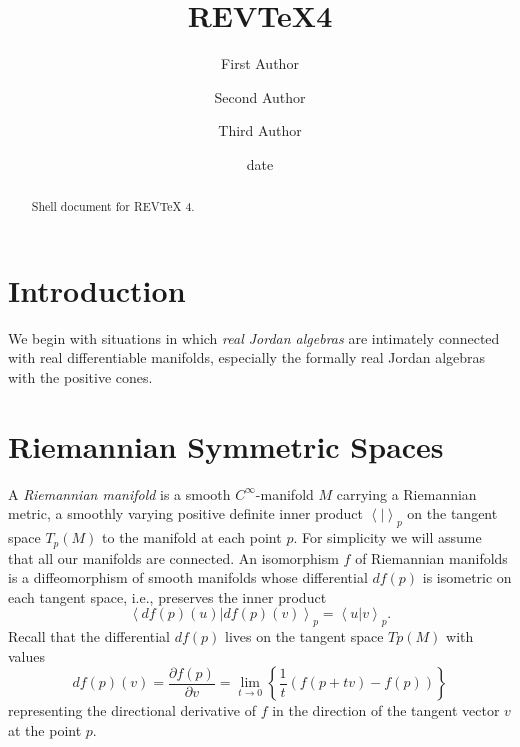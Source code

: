 \documentclass[aps,preprint]{revtex4}%
\begin{document}
\title[Short title for running header]{REV\TeX4}
\author{First Author}
\author{Second Author}
\author{Third Author}

\begin{abstract}
Shell document for REV\TeX{} 4.

\end{abstract}
\date[Date text]{date}




\maketitle
\tableofcontents


\section{Introduction}

We begin with situations in which \emph{real Jordan algebras} are intimately
connected with real differentiable manifolds, especially the formally real
Jordan algebras with the positive cones.

\section{Riemannian Symmetric Spaces}

A \emph{Riemannian manifold} is a smooth $C^{\infty}$-manifold $M$ carrying a
Riemannian metric, a smoothly varying positive definite inner product
$\left\langle \left.  {}\right\vert \right\rangle _{p}$ on the tangent space
$T_{p}(M)$ to the manifold at each point $p$. For simplicity we will assume
that all our manifolds are connected. An isomorphism $f$ of Riemannian
manifolds is a diffeomorphism of smooth manifolds whose differential
$df\left(  p\right)  $ is isometric on each tangent space, i.e., preserves the
inner product
\begin{equation}
\left\langle \left.  df\left(  p\right)  \left(  u\right)  \right\vert
df\left(  p\right)  \left(  v\right)  \right\rangle _{p}=\left\langle \left.
u\right\vert v\right\rangle _{p}.
\end{equation}
Recall that the differential $df\left(  p\right)  $ lives on the tangent space
$Tp(M)$ with values
\begin{equation}
df\left(  p\right)  \left(  v\right)  =\frac{\partial f\left(  p\right)
}{\partial v}=\lim\limits_{t\rightarrow0}\left\{  \frac{1}{t}\left(  f\left(
p+tv\right)  -f\left(  p\right)  \right)  \right\}
\end{equation}
representing the directional derivative of $f$ in the direction of the tangent
vector $v$ at the point $p$.
\end{document}
